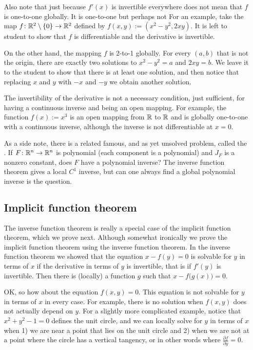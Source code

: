 \begin{example}
Also note that just because $f'(x)$ is invertible everywhere does not
mean that $f$ is
one-to-one globally.  It is  one-to-one but perhaps not
  For an
example, take the map $f \colon {\mathbb{R}}^2 \setminus \{ 0 \} \to {\mathbb{R}}^2$ defined
by $f(x,y) := (x^2-y^2,2xy)$.
It is left to student to show that $f$ is
differentiable and the derivative is invertible.

On the other hand, the mapping $f$ is 2-to-1 globally.  For every
$(a,b)$ that is not the origin, there are exactly two
solutions to $x^2-y^2=a$ and $2xy=b$.  We leave it to the student
to show that there is at least one solution, and then notice
that replacing $x$ and $y$ with $-x$ and $-y$ we obtain another solution.
\end{example}

The invertibility of the derivative is not a necessary
condition, just sufficient, for having a continuous inverse and being an open
mapping.  For example, the function $f(x) := x^3$ is an open mapping from ${\mathbb{R}}$
to ${\mathbb{R}}$ and is globally one-to-one with a continuous inverse, although the
inverse is not differentiable at $x=0$.

\medskip

As a side note, there is a related famous, and as yet unsolved problem,
called the \emph{}.  If $F \colon {\mathbb{R}}^n \to
{\mathbb{R}}^n$ is polynomial (each component is a polynomial) and $J_F$ is a nonzero
constant, does $F$ have a polynomial inverse?
The inverse function theorem gives a local $C^1$ inverse, but can one always
find a global polynomial inverse is the question.

\subsection{Implicit function theorem}

The inverse function theorem is really a special case of the implicit
function theorem, which we prove next.  Although somewhat ironically we 
prove the implicit function theorem using the inverse function theorem.
In the inverse function theorem we showed that
the equation $x-f(y) = 0$ is solvable for $y$ in terms of $x$ if the derivative
in terms of $y$ is invertible, that is if $f'(y)$ is invertible.
Then there is (locally) a
function $g$ such that $x-f\bigl(g(x)\bigr) = 0$.

OK\@, so how about the equation $f(x,y) = 0$.  This equation is
not solvable for $y$ in terms of $x$ in every case.  For example,
there is no solution
when $f(x,y)$ does not actually depend on $y$.  For a slightly more
complicated example, notice that $x^2+y^2-1 = 0$ defines the unit circle, and
we can locally solve for $y$ in terms of $x$ when 1) we are near
a point that lies on the unit circle and 2) when we are not at a point
where the circle has a vertical tangency, or in other words where
$\frac{\partial f}{\partial y} = 0$.


